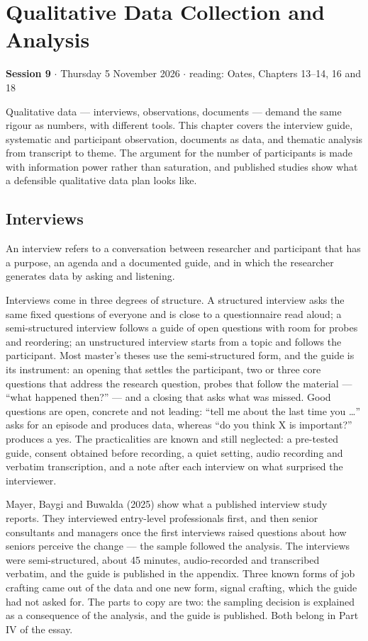 \documentclass[11pt,a4paper,british,twoside=false,headings=small,chapterprefix=false,numbers=noenddot]{scrbook}
\newenvironment{block}[1]{\begin{tcolorbox}[scriptbox, title={#1}]}{\end{tcolorbox}}
\newcommand{\sessionhead}[2]{\begin{tcolorbox}[enhanced, colback=uiamutedblue, colframe=uiamutedblue, arc=1.5pt, left=6pt, right=6pt]
  \small \textbf{Session #1} \;$\cdot$\; #2\end{tcolorbox}}
\begin{document}
\chapter{Qualitative Data Collection and Analysis}
\label{ch:9}
\sessionhead{9}{Thursday 5 November 2026 \;$\cdot$\; reading: Oates, Chapters 13--14, 16 and 18}

Qualitative data --- interviews, observations, documents --- demand the same rigour as numbers, with different tools. This chapter covers the interview guide, systematic and participant observation, documents as data, and thematic analysis from transcript to theme. The argument for the number of participants is made with information power rather than saturation, and published studies show what a defensible qualitative data plan looks like.


\section{Interviews}

\begin{block}{Interview}
An interview refers to a conversation between researcher and participant that has a purpose, an agenda and a documented guide, and in which the researcher generates data by asking and listening.
\end{block}

Interviews come in three degrees of structure. A structured interview asks the same fixed questions of everyone and is close to a questionnaire read aloud; a semi-structured interview follows a guide of open questions with room for probes and reordering; an unstructured interview starts from a topic and follows the participant. Most master's theses use the semi-structured form, and the guide is its instrument: an opening that settles the participant, two or three core questions that address the research question, probes that follow the material --- ``what happened then?'' --- and a closing that asks what was missed. Good questions are open, concrete and not leading: ``tell me about the last time you \dots'' asks for an episode and produces data, whereas ``do you think X is important?'' produces a yes. The practicalities are known and still neglected: a pre-tested guide, consent obtained before recording, a quiet setting, audio recording and verbatim transcription, and a note after each interview on what surprised the interviewer.

Mayer, Baygi and Buwalda (2025) show what a published interview study reports. They interviewed entry-level professionals first, and then senior consultants and managers once the first interviews raised questions about how seniors perceive the change --- the sample followed the analysis. The interviews were semi-structured, about 45 minutes, audio-recorded and transcribed verbatim, and the guide is published in the appendix. Three known forms of job crafting came out of the data and one new form, signal crafting, which the guide had not asked for. The parts to copy are two: the sampling decision is explained as a consequence of the analysis, and the guide is published. Both belong in Part IV of the essay.
\end{document}
